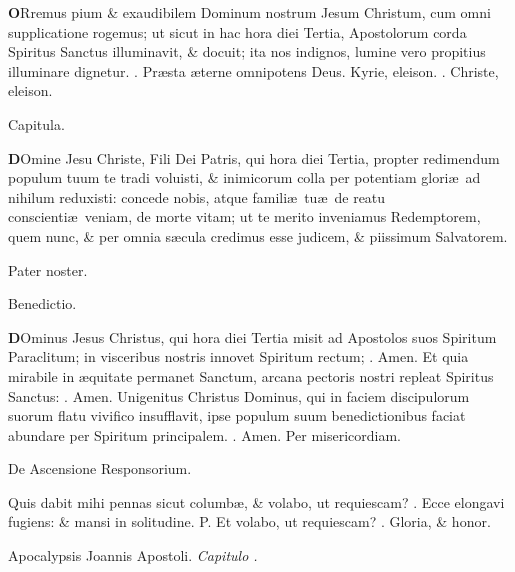 \documentclass[letter,11pt]{book}
\makeatletter
\DeclareRobustCommand{\Vbar}{\vers@resp{-0.1em}{V}}
\DeclareRobustCommand{\Rbar}{\vers@resp{0pt}{R}}
\newcommand{\vers@resp@sym}{\raisebox{0.2ex}{\rotatebox[origin=c]{-20}{$\m@th\rceil$}}}
\newcommand{\vers@resp}[2]{%
  {\ooalign{\hidewidth\kern#1\vers@resp@sym\hidewidth\cr#2\cr}}%
}%
\def\P{\color{Red} P. \color{black}}
\def\V{\color{Red} \Vbar . \color{black}}
\def\R{\color{Red} \Rbar . \color{black}}
\makeatother
\begin{document}
\begin{multicols*}{2}
\lettrine[lines=2]{\bfseries \color{Red} O}{}Rremus pium \& exaudibilem Dominum nostrum Jesum Christum, cum omni supplicatione rogemus; ut sicut in hac hora diei Tertia, Apostolorum corda Spiritus Sanctus illuminavit, \& docuit; ita nos indignos, lumine vero propitius illuminare dignetur. \R Pr\ae sta \ae terne omnipotens Deus. Kyrie, eleison. \R Christe, eleison.
\vspace{-.5em} \begin{center} \color{Red} Capitula. \end{center} \vspace{-.5em}
\lettrine[lines=2]{\bfseries \color{Red} D}{}Omine Jesu Christe, Fili Dei Patris, qui hora diei Tertia, propter redimendum populum tuum te tradi voluisti, \& inimicorum colla per potentiam glori\ae \ ad nihilum reduxisti: concede nobis, atque famili\ae \ tu\ae \ de reatu conscienti\ae \ veniam, de morte vitam; ut te merito inveniamus Redemptorem, quem nunc, \& per omnia s\ae cula credimus esse judicem, \& piissimum Salvatorem.
\par Pater noster.
\vspace{-.5em} \begin{center} \color{Red} Benedictio. \end{center} \vspace{-.5em}
\lettrine[lines=2]{\bfseries \color{Red} D}{}Ominus Jesus Christus, qui hora diei Tertia misit ad Apostolos suos Spiritum Paraclitum; in visceribus nostris innovet Spiritum rectum; \R Amen. Et quia mirabile in \ae quitate permanet Sanctum, arcana pectoris nostri repleat Spiritus Sanctus: \R Amen. Unigenitus Christus Dominus, qui in faciem discipulorum suorum flatu vivifico insufflavit, ipse populum suum benedictionibus faciat abundare per Spiritum principalem. \R Amen. Per misericordiam.
\vspace{-.5em} \begin{center} \color{Red} De Ascensione Responsorium. \end{center} \vspace{-.5em}
\par \noindent Quis dabit mihi pennas sicut columb\ae , \& volabo, ut requiescam? \V Ecce elongavi fugiens: \& mansi in solitudine. \P Et volabo, ut requiescam? \V Gloria, \& honor.
\vspace{-.5em} \begin{center} {\color{Red} A}pocalypsis Joannis Apostoli. \itshape Capitulo . \end{center} \vspace{-.5em}

\end{multicols*}
\end{document}
